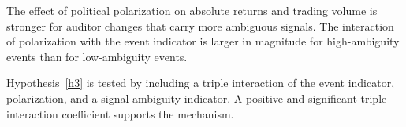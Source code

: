 \begin{hyp}
    \label{h3}
    The effect of political polarization on absolute returns and trading volume
    is stronger for auditor changes that carry more ambiguous signals. The
    interaction of polarization with the event indicator is larger in magnitude
    for high-ambiguity events than for low-ambiguity events.
\end{hyp}

Hypothesis~\ref{h3} is tested by including a triple interaction of the event
indicator, polarization, and a signal-ambiguity indicator. A positive and
significant triple interaction coefficient supports the mechanism.
